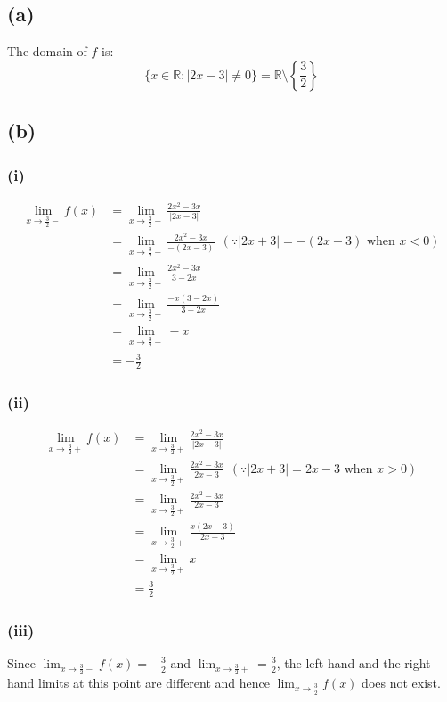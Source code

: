 \documentclass[11pt]{article}
\begin{document}
\subsection{(a)}
\label{sec:orga551f47}

The domain of \(f\) is:
\[\{x \in \mathbb{R} : |2x - 3| \neq 0\} = \mathbb{R} \setminus \left\{\frac{3}{2} \right\}\]

\subsection{(b)}
\label{sec:org22f33c6}

\subsubsection{(i)}
\label{sec:org4d25951}
\begin{align*}
\lim_{x \rightarrow \frac{3}{2}-} f(x) &= \lim_{x \rightarrow \frac{3}{2}-} \frac{2x^2 - 3x}{|2x - 3|} \\
&= \lim_{x \rightarrow \frac{3}{2}-} \frac{2x^2 - 3x}{-(2x - 3)} \ \ (\because |2x + 3| = -(2x - 3) \text{ when } x < 0) \\
&= \lim_{x \rightarrow \frac{3}{2}-} \frac{2x^2 - 3x}{3 - 2x} \\
&= \lim_{x \rightarrow \frac{3}{2}-}\frac{-x(3 - 2x)}{3 - 2x} \\
&= \lim_{x \rightarrow \frac{3}{2}-} -x \\
&= - \frac{3}{2}
\end{align*}

\subsubsection{(ii)}
\label{sec:org8525dd7}
\begin{align*}
\lim_{x \rightarrow \frac{3}{2}+} f(x) &= \lim_{x \rightarrow \frac{3}{2}+} \frac{2x^2 - 3x}{|2x - 3|} \\
&= \lim_{x \rightarrow \frac{3}{2}+} \frac{2x^2 - 3x}{2x - 3} \ \ (\because |2x + 3| = 2x - 3 \text{ when } x > 0) \\
&= \lim_{x \rightarrow \frac{3}{2}+} \frac{2x^2 - 3x}{2x - 3} \\
&= \lim_{x \rightarrow \frac{3}{2}+}\frac{x(2x - 3)}{2x - 3} \\
&= \lim_{x \rightarrow \frac{3}{2}+} x \\
&= \frac{3}{2}
\end{align*}

\subsubsection{(iii)}
\label{sec:org2bd6e7b}
Since \(\lim_{x \rightarrow \frac{3}{2}-} f(x) = -\frac{3}{2}\) and \(\lim_{x \rightarrow \frac{3}{2}+} = \frac{3}{2}\), the left-hand and the right-hand limits at this point are different and hence \(\lim_{x \rightarrow \frac{3}{2}} f(x)\) does not exist.
\end{document}
